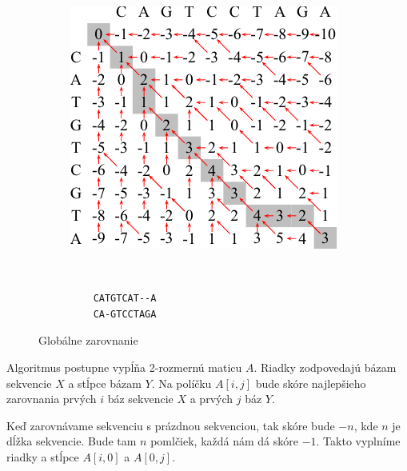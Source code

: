 
\begin{figure}[htp]
    \centering
    \begin{subfigure}[m]{0.5\textwidth}    
    \centering
    \includegraphics[width=\textwidth]{images/global_alignment}
    \end{subfigure}    
    ~
    \begin{subfigure}[m]{0.3\textwidth}    
    \centering
    \begin{verbatim}
    CATGTCAT--A
    CA-GTCCTAGA
    \end{verbatim}
    \end{subfigure}
    \caption{Globálne zarovnanie}    
    \label{fig:global_align}
\end{figure}

Algoritmus postupne vypĺňa 2-rozmernú maticu $A$. Riadky zodpovedajú bázam sekvencie $X$ a stĺpce bázam $Y$. Na políčku $A[i,j]$ bude skóre najlepšieho zarovnania prvých $i$ báz sekvencie $X$ a prvých $j$ báz $Y$.

Keď zarovnávame sekvenciu s prázdnou sekvenciou, tak skóre bude $-n$, kde $n$ je dĺžka sekvencie. Bude tam $n$ pomlčiek, každá nám dá skóre $-1$. Takto vyplníme riadky a stĺpce $A[i,0]$ a $A[0,j]$.

